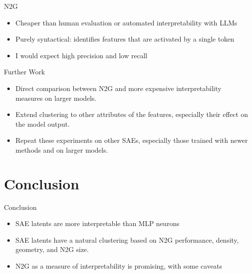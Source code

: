 \documentclass[aspectratio=169,hyperref={pdfpagelabels=false}]{beamer}
\begin{document}
\begin{frame}{N2G} %
    \begin{itemize}
        \item Cheaper than human evaluation or automated interpretability with LLMs
        \item Purely syntactical: identifies features that are activated by a single token
        \item I would expect high precision and low recall
    \end{itemize}
\end{frame}

\begin{frame}{Further Work} %
    \begin{itemize}
        \item Direct comparison between N2G and more expensive interpretability measures on larger models.
        \item Extend clustering to other attributes of the features, especially their effect on the model output.
        \item Repeat these experiments on other SAEs, especially those trained with newer methods and on larger models.
    \end{itemize}
\end{frame}


\section{Conclusion} %
\begin{frame}{Conclusion} %
    \begin{itemize}
        \item SAE latents are more interpretable than MLP neurons
        \item SAE latents have a natural clustering based on N2G performance, density, geometry, and N2G size.
        \item N2G as a measure of interpretability is promising, with some caveats
    \end{itemize}
\end{frame}
\note{

}
\end{document}
